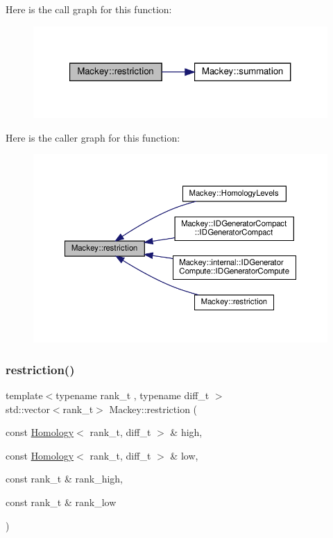 Here is the call graph for this function\+:\nopagebreak
\begin{figure}[H]
\begin{center}
\leavevmode
\includegraphics[width=321pt]{namespaceMackey_ad1e907ff76b07d4fc4c9d4bdf25918bd_cgraph}
\end{center}
\end{figure}
Here is the caller graph for this function\+:\nopagebreak
\begin{figure}[H]
\begin{center}
\leavevmode
\includegraphics[width=350pt]{namespaceMackey_ad1e907ff76b07d4fc4c9d4bdf25918bd_icgraph}
\end{center}
\end{figure}
\mbox{\label{namespaceMackey_a7b62b0d041087605dabd4ab3753f1186}} 
\subsubsection{\texorpdfstring{restriction()}{restriction()}\hspace{0.1cm}{\footnotesize\ttfamily [2/2]}}
{\footnotesize\ttfamily template$<$typename rank\+\_\+t , typename diff\+\_\+t $>$ \\
std\+::vector$<$rank\+\_\+t$>$ Mackey\+::restriction (\begin{DoxyParamCaption}\item[{const \hyperlink{classMackey_1_1Homology}{Homology}$<$ rank\+\_\+t, diff\+\_\+t $>$ \&}]{high,  }\item[{const \hyperlink{classMackey_1_1Homology}{Homology}$<$ rank\+\_\+t, diff\+\_\+t $>$ \&}]{low,  }\item[{const rank\+\_\+t \&}]{rank\+\_\+high,  }\item[{const rank\+\_\+t \&}]{rank\+\_\+low }\end{DoxyParamCaption})}



